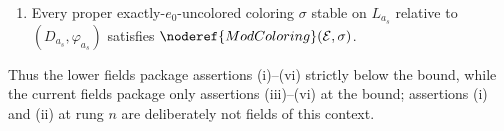 \begin{definition}
\begin{enumerate}
\item[\texttt{currentSix}.]
Every proper exactly-\(e_0\)-uncolored coloring \(\sigma\) stable on
\(L_{a_s}\) relative to \((D_{a_s},\varphi_{a_s})\) satisfies
\(\noderef{ModColoring}(\mathcal E,\sigma)\).
\end{enumerate}

Thus the lower fields package assertions (i)--(vi) strictly below the
bound, while the current fields package only assertions (iii)--(vi) at the
bound; assertions (i) and (ii) at rung \(n\) are deliberately not fields of
this context.
\end{definition}
